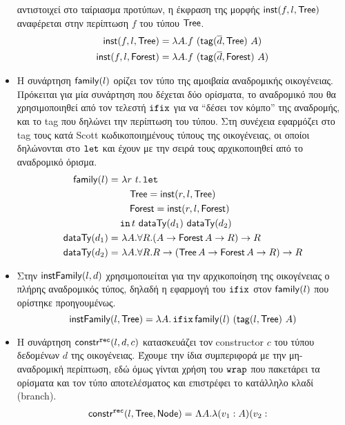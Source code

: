 \begin{itemize}
        αντιστοιχεί στο ταίριασμα προτύπων, η έκφραση της μορφής
        $\mathsf{inst}(f, l, \operatorname{\textsf{Tree}})$ αναφέρεται στην περίπτωση $f$ του τύπου $\operatorname{\textsf{Tree}}$.
        \begin{align*} \mathsf{inst}(f, l, \operatorname{\textsf{Tree}}) &= \lambda A . f\
          (\mathsf{tag}(\overline{d}, \operatorname{\textsf{Tree}})\ A)\\ \mathsf{inst}(f, l, \operatorname{\textsf{Forest}}) &= \lambda A .
          f\ (\mathsf{tag}(\overline{d}, \operatorname{\textsf{Forest}})\ A) \end{align*} \item Η συνάρτηση
            $\mathsf{family}(l)$ ορίζει τον τύπο της αμοιβαία αναδρομικής
            οικογένειας. Πρόκειται για μία συνάρτηση που δέχεται δύο ορίσματα,
            το αναδρομικό που θα χρησιμοποιηθεί από τον τελεστή $\operatorname{\texttt{ifix}}$ για να
            ``δέσει τον κόμπο'' της αναδρομής, και το tag που δηλώνει την
            περίπτωση του τύπου. Στη συνέχεια εφαρμόζει στο tag τους κατά Scott
            κωδικοποιημένους τύπους της οικογένειας, οι οποίοι δηλώνονται στο
            $\operatorname{\texttt{let}}$ και έχουν με την σειρά τους αρχικοποιηθεί από το αναδρομικό
            όρισμα.
%
    \begin{align*} \mathsf{family}(l) =&\ \lambda r\ t . \operatorname{\texttt{let}} \\ &\quad\operatorname{\textsf{Tree}} =
      \mathsf{inst}(r, l, \operatorname{\textsf{Tree}})\\ &\quad\operatorname{\textsf{Forest}} = \mathsf{inst}(r, l, \operatorname{\textsf{Forest}})\\ &\operatorname{\texttt{in}} t\
      \mathsf{dataTy}(d_1)\ \mathsf{dataTy}(d_2)\\ \mathsf{dataTy}(d_1) =&\ \lambda A . \forall R .
      (A \rightarrow \operatorname{\textsf{Forest}} A \rightarrow R) \rightarrow R\\ \mathsf{dataTy}(d_2) =&\
    \lambda A . \forall R . R \rightarrow (\operatorname{\textsf{Tree}} A \rightarrow \operatorname{\textsf{Forest}} A
    \rightarrow R) \rightarrow R \end{align*} \item Στην $\mathsf{instFamily}(l, d)$
      χρησιμοποιείται για την αρχικοποίηση της οικογένειας ο πλήρης αναδρομικός
      τύπος, δηλαδή η εφαρμογή του $\operatorname{\texttt{ifix}}$ στον $\mathsf{family}(l)$ που ορίστηκε
      προηγουμένως.  $$\mathsf{instFamily}(l, \operatorname{\textsf{Tree}}) = \lambda A . \operatorname{\texttt{ifix}} \mathsf{family}(l)\
    (\mathsf{tag}(l, \operatorname{\textsf{Tree}})\ A)$$ \item Η συνάρτηση $\mathsf{constr}^{\operatorname{\texttt{rec}}}(l, d, c)$
      κατασκευάζει τον constructor $c$ του τύπου δεδομένων $d$ της οικογένειας.
      Έχουμε την ίδια συμπεριφορά με την μη-αναδρομική περίπτωση, εδώ όμως
      γίνται χρήση του $\operatorname{\texttt{wrap}}$ που πακετάρει τα ορίσματα και τον τύπο
      αποτελέσματος και επιστρέφει το κατάλληλο κλαδί (branch).  \begin{align*}
        \constrRec{l}{\Tree}{\Node} =&\ \Lambda A . \lambda (v_1 : A) (v_2 :

\end{align*}
\end{itemize}
